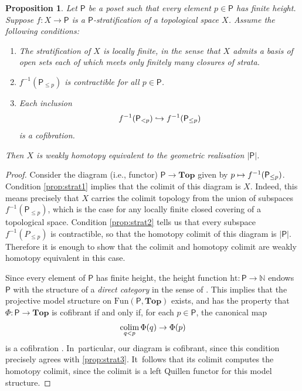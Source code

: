 \documentclass[11pt]{article}
\newcommand{\ie}{i.e.,\xspace}
\newcommand\mto{\mathchoice{\longmapsto}{\mapsto}{\mapsto}{\mapsto}}
\newcommand\hto{\mathrel{\lhook\joinrel\to}}
\theoremstyle{plain}
\newtheorem{prop}[thm]{Proposition}
\theoremstyle{definition}
\newcommand{\Po}{\mathsf{P}}
\newcommand{\Ht}{{\mathrm{ht}}}
\begin{document}
\begin{prop}\label{prop:strat}
Let $\Po$ be a poset such that every element $p \in \Po$ has finite height. Suppose $f \colon X \to \Po$ is a $\Po$-stratification of a topological space $X$. Assume the following conditions:
\begin{enumerate}
\item\label{prop:strat1} The stratification of $X$ is locally finite, in the sense that $X$ admits a basis of open sets each of which meets only finitely many closures of strata.
\item\label{prop:strat2} $f^{-1}(\Po_{\leq p})$ is contractible for all $p \in \Po$.
\item\label{prop:strat3} Each inclusion
\[
f^{-1}(\Po_{<p}) \hto f^{-1}(\Po_{\leq p})
\]
is a cofibration.
\end{enumerate}
Then $X$ is weakly homotopy equivalent to the geometric realisation $|\Po|$.
\end{prop}

\begin{proof}
Consider the diagram (\ie functor) $\Po \to \mathbf{Top}$ given by $p \mto f^{-1}(\Po_{\leq p})$. Condition \eqref{prop:strat1} implies that the colimit of this diagram is $X$. Indeed, this means precisely that $X$ carries the colimit topology from the union of subspaces $f^{-1}(\Po_{\leq p})$, which is the case for any locally finite closed covering of a topological space. Condition \eqref{prop:strat2} tells us that every subspace $f^{-1}(P_{\leq p})$ is contractible, so that the homotopy colimit of this diagram is $|\Po|$. Therefore it is enough to show that the colimit and homotopy colimit are weakly homotopy equivalent in this case.

Since every element of $\Po$ has finite height, the height function $\Ht \colon \Po \to \mathbb{N}$ endows~$\Po$ with the structure of a \emph{direct category} in the sense of \cite[\S5.1]{hovey}. This implies that the projective model structure on $\mathrm{Fun}(\Po,\mathbf{Top})$ exists, and has the property that $\Phi :\Po \to \mathbf{Top}$ is cofibrant if and only if, for each $p \in \Po$, the canonical map\vspace*{-3pt}
\[
\operatornamewithlimits{colim}_{q<p} \Phi(q) \to \Phi(p)
\]
is a cofibration \cite[Th.\,5.1.3]{hovey}. In~particular, our diagram is cofibrant, since this condition precisely agrees with \eqref{prop:strat3}. It~follows that its colimit computes the homotopy colimit, since the colimit is a left Quillen functor for this model structure.\end{proof}
\end{document}
